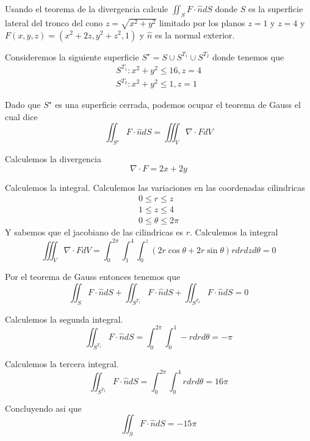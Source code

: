 \message{ !name(MAT024.tex)}\documentclass[../main.tex]{subfiles}
\begin{document}
\begin{problem}
  Usando el teorema de la divergencia calcule $\iint_{S} F \cdot \hat{n} dS$ donde $S$ es la superficie lateral
  del tronco del cono $z = \sqrt{x^{2} + y^{2}}$ limitado por los planos $z = 1$ y $z = 4$ y
  $F(x, y, z) = (x^{2} + 2z, y^{2} + z^{2}, 1)$ y $\hat{n}$ es la normal exterior.
\end{problem}
\begin{solution}
  Consideremos la siguiente superficie $S^{\star} = S \cup S^{T_{1}} \cup S^{T_{2}}$ donde tenemos que
  \begin{gather*}
    S^{T_{1}}: x^{2} + y^{2} \leq 16, z = 4\\
    S^{T_{2}}: x^{2} + y^{2} \leq 1, z = 1
  \end{gather*}

  Dado que $S^{\star}$ es una superficie cerrada, podemos ocupar el teorema de Gauss el cual dice
  \begin{equation*}
    \iint_{S^{\star}} F \cdot \hat{n} dS = \iiint_{V} \nabla \cdot F dV
  \end{equation*}

  Calculemos la divergencia
  \begin{equation*}
    \nabla \cdot F = 2x + 2y
  \end{equation*}

  Calculemos la integral. Calculemos las variaciones en las coordenadas cilindricas
  \begin{gather*}
    0 \leq r \leq z\\
    1 \leq z \leq 4\\
    0 \leq \theta \leq 2\pi
  \end{gather*}
  Y sabemos que el jacobiano de las cilindricas es $r$. Calculemos la integral
  \begin{equation*}
    \iiint_{V} \nabla \cdot F dV = \int_{0}^{2\pi}\int_{1}^{4}\int_{0}^{z} (2r \cos \theta + 2r \sin \theta) r dr dz d \theta = 0
  \end{equation*}

  Por el teorema de Gauss entonces tenemos que
  \begin{equation*}
    \iint_{S} F \cdot \hat{n} dS + \iint_{S^{T_{1}}} F \cdot \hat{n} dS + \iint_{S^{T_{2}}} F \cdot \hat{n} dS = 0
  \end{equation*}

  Calculemos la segunda integral.
  \begin{equation*}
    \iint_{S^{T_{1}}} F \cdot \hat{n} dS = \int_{0}^{2\pi}\int_{0}^{1} -r dr d\theta = -\pi
  \end{equation*}

  Calculemos la tercera integral.
  \begin{equation*}
    \iint_{S^{T_{2}}} F \cdot \hat{n} dS = \int_{0}^{2\pi}\int_{0}^{4} r dr d \theta = 16\pi
  \end{equation*}

  Concluyendo asi que
  \begin{equation*}
    \iint_{S} F \cdot \hat{n} dS = -15\pi
  \end{equation*}
\end{solution}
\end{document}
